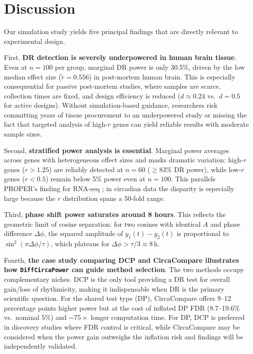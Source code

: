 \documentclass{article}
\newcommand{\software}[1]{\texttt{#1}}
\begin{document}
\section{Discussion}

Our simulation study yields five principal findings that are directly relevant to experimental design.

First, \textbf{DR detection is severely underpowered in human brain tissue}. Even at $n = 100$ per group, marginal DR power is only 30.5\%, driven by the low median effect size ($\tilde{r} = 0.556$) in post-mortem human brain. This is especially consequential for passive post-mortem studies, where samples are scarce, collection times are fixed, and design efficiency is reduced ($d \approx 0.24$ vs.\ $d = 0.5$ for active designs). Without simulation-based guidance, researchers risk committing years of tissue procurement to an underpowered study or missing the fact that targeted analysis of high-$r$ genes can yield reliable results with moderate sample sizes.

Second, \textbf{stratified power analysis is essential}. Marginal power averages across genes with heterogeneous effect sizes and masks dramatic variation: high-$r$ genes ($r > 1.25$) are reliably detected at $n = 60$ ($\geq$83\% DR power), while low-$r$ genes ($r < 0.5$) remain below 5\% power even at $n = 100$. This parallels PROPER's finding for RNA-seq \cite{wu2015proper}; in circadian data the disparity is especially large because the $r$ distribution spans a 50-fold range.

Third, \textbf{phase shift power saturates around 8 hours}. This reflects the geometric limit of cosine separation: for two cosines with identical $A$ and phase difference $\Delta\phi$, the squared amplitude of $y_1(t) - y_2(t)$ is proportional to $\sin^2(\pi\Delta\phi/\tau)$, which plateaus for $\Delta\phi > \tau/3 \approx 8$\,h.

Fourth, \textbf{the case study comparing DCP and CircaCompare illustrates how \software{DiffCircaPower} can guide method selection}. The two methods occupy complementary niches. DCP is the only tool providing a DR test for overall gain/loss of rhythmicity, making it indispensable when DR is the primary scientific question. For the shared test type (DP), CircaCompare offers 9--12 percentage points higher power but at the cost of inflated DP FDR (8.7--19.6\% vs.\ nominal 5\%) and ${\sim}75\times$ longer computation time. For DP, DCP is preferred in discovery studies where FDR control is critical, while CircaCompare may be considered when the power gain outweighs the inflation risk and findings will be independently validated.
\end{document}
